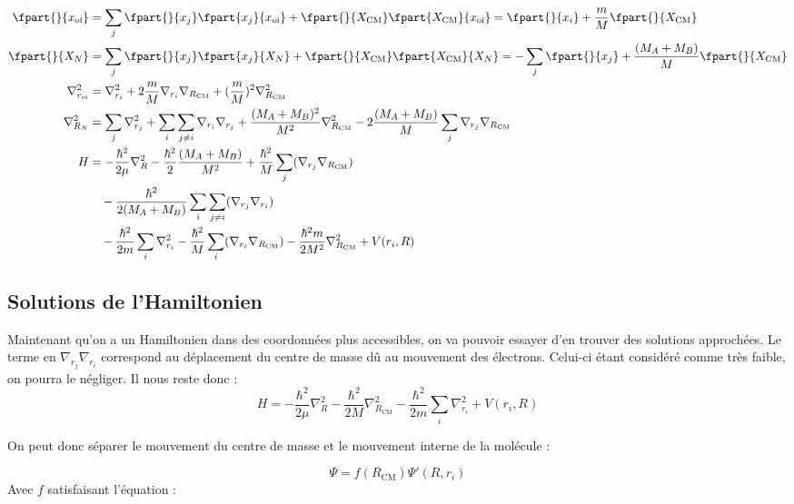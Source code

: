 \begin{align*}
    \fpart{}{x_\text{oi}} &= \sum\limits_j\fpart{}{x_j}\fpart{x_j}{x_\text{oi}} + \fpart{}{X_\text{CM}}\fpart{X_\text{CM}}{x_\text{oi}} = \fpart{}{x_i} + \dfrac{m}{M}\fpart{}{X_\text{CM}} \\
    \fpart{}{X_N} &= \sum\limits_j\fpart{}{x_j}\fpart{x_j}{X_N} + \fpart{}{X_\text{CM}}\fpart{X_\text{CM}}{X_N} = - \sum\limits_j\fpart{}{x_j} + \dfrac{(M_A + M_B)}{M}\fpart{}{X_\text{CM}} \\
    \nabla^2_{r_\text{oi}} &= \nabla^2_{r_{i}} + 2\dfrac{m}{M}\nabla_{r_i}\nabla_{R_\text{CM}} + (\dfrac{m}{M})^2\nabla^2_{R_\text{CM}} \\
    \nabla^2_{R_N} &= \sum\limits_j\nabla^2_{r_j} + \sum\limits_i\sum\limits_{j\neq i}\nabla_{r_i}\nabla_{r_j} + \dfrac{(M_A + M_B)^2}{M^2}\nabla^2_{R_\text{CM}} - 2\dfrac{(M_A + M_B)}{M}\sum\limits_j \nabla_{r_j}\nabla_{R_\text{CM}}\\
    H &= -\dfrac{\hbar^2}{2\mu}\nabla^2_R - \dfrac{\hbar^2}{2}\dfrac{(M_A + M_B)}{M^2} + \dfrac{\hbar^2}{M}\sum\limits_j(\nabla_{r_j}\nabla_{R_\text{CM}}) \\
    &\quad -\dfrac{\hbar^2}{2(M_A + M_B)}\sum\limits_i\sum\limits_{j\neq i}(\nabla_{r_j}\nabla_{r_i}) \\
    &\quad -\dfrac{\hbar^2}{2m}\sum\limits_i \nabla^2_{r_{i}} - \dfrac{\hbar^2}{M}\sum\limits_i(\nabla_{r_i}\nabla_{R_\text{CM}}) - \dfrac{\hbar^2 m}{2M^2}\nabla^2_{R_\text{CM}} + V(r_i, R) \\
\end{align*}


\subsection{Solutions de l'Hamiltonien}\label{Solutions de l'hamiltonien}


Maintenant qu'on a un Hamiltonien dans des coordonnées plus accessibles, on va pouvoir essayer d'en trouver des solutions approchées. Le terme en $\nabla_{r_j}\nabla_{r_i}$ correspond au déplacement du centre de masse dû au mouvement des électrons. Celui-ci étant considéré comme très faible, on pourra le négliger. Il nous reste donc :
\[
H = -\dfrac{\hbar^2}{2\mu}\nabla^2_R - \dfrac{\hbar^2}{2M}\nabla^2_{R_\text{CM}} -\dfrac{\hbar^2}{2m}\sum\limits_i \nabla^2_{r_{i}} + V(r_i, R)
\]


On peut donc séparer le mouvement du centre de masse et le mouvement interne de la molécule :


\[ \Psi = f(R_\text{CM})\Psi'(R,r_i) \]
Avec $f$ satisfaisant l'équation :


